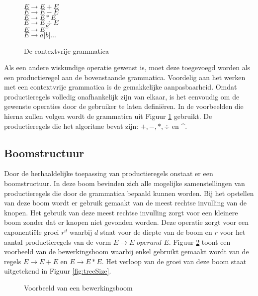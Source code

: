 \documentclass[Main.tex]{subfiles}
\begin{document}
\begin{figure}[!htb]
\centering
\begin{framed}
$E \rightarrow E + E$ \\
$E \rightarrow E - E$ \\
$E \rightarrow E \ast E$ \\
$E \rightarrow E \div E$ \\
$E \rightarrow E^{E}$ \\
$E \rightarrow a | b | \dotsc$
\end{framed}
\caption{De contextvrije grammatica}
\label{fig:cfg}
\end{figure}

Als een andere wiskundige operatie gewenst is, moet deze toegevoegd worden als een productieregel aan de bovenstaande grammatica. Voordelig aan het werken met een contextvrije grammatica is de gemakkelijke aanpasbaarheid. Omdat productieregels volledig onafhankelijk zijn van elkaar, is het eenvoudig om de gewenste operaties door de gebruiker te laten defini\"eren. In de voorbeelden die hierna zullen volgen wordt de grammatica uit Figuur \ref{fig:cfg} gebruikt. De productieregels die het algoritme bevat zijn: $+, -, \ast, \div$ en \^{}.

\subsection{Boomstructuur}

Door de herhaaldelijke toepassing van productieregels onstaat er een boomstructuur. In deze boom bevinden zich alle mogelijke samenstellingen van productieregels die door de grammatica bepaald kunnen worden. Bij het opstellen van deze boom wordt er gebruik gemaakt van de meest rechtse invulling van de knopen. Het gebruik van deze meest rechtse invulling zorgt voor een kleinere boom zonder dat er knopen niet gevonden worden. Deze operatie zorgt voor een exponenti\"ele groei $r^{d}$ waarbij $d$ staat voor de diepte van de boom en $r$ voor het aantal productieregels van de vorm $E \rightarrow E$  $operand$ $ E$. Figuur \ref{fig:vbBoom} toont een voorbeeld van de bewerkingsboom waarbij enkel gebruikt gemaakt wordt van de regels $E \rightarrow E+E$ en $E \rightarrow E \ast E$. Het verloop van de groei van deze boom staat uitgetekend in Figuur \ref{fig:treeSize}.

\begin{figure}[!htb]
\centering
{}
\caption{Voorbeeld van een bewerkingsboom} \label{fig:vbBoom}
\end{figure}
\end{document}
